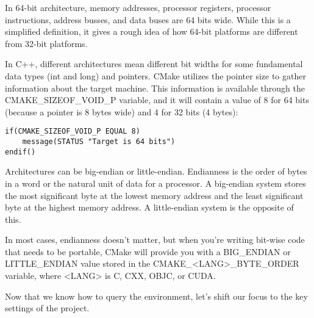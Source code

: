 
In 64-bit architecture, memory addresses, processor registers, processor instructions, address busses, and data buses are 64 bits wide. While this is a simplified definition, it gives a rough idea of how 64-bit platforms are different from 32-bit platforms.

In C++, different architectures mean different bit widths for some fundamental data types (int and long) and pointers. CMake utilizes the pointer size to gather information about the target machine. This information is available through the CMAKE\_SIZEOF\_VOID\_P variable, and it will contain a value of 8 for 64 bits (because a pointer is 8 bytes wide) and 4 for 32 bits (4 bytes):

\begin{lstlisting}[style=styleCMake]
if(CMAKE_SIZEOF_VOID_P EQUAL 8)
	message(STATUS "Target is 64 bits")
endif()
\end{lstlisting}


Architectures can be big-endian or little-endian. Endianness is the order of bytes in a word or the natural unit of data for a processor. A big-endian system stores the most significant byte at the lowest memory address and the least significant byte at the highest memory address. A little-endian system is the opposite of this.

In most cases, endianness doesn't matter, but when you're writing bit-wise code that needs to be portable, CMake will provide you with a BIG\_ENDIAN or LITTLE\_ENDIAN value stored in the CMAKE\_<LANG>\_BYTE\_ORDER variable, where <LANG> is C, CXX, OBJC, or CUDA.

Now that we know how to query the environment, let's shift our focus to the key settings of the project.

